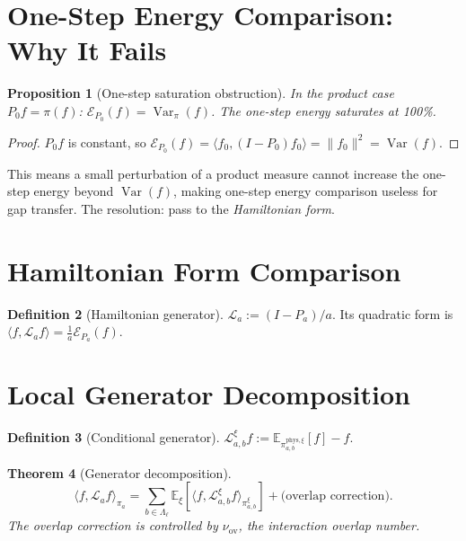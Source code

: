 \documentclass[12pt]{article}
\theoremstyle{plain}
\newtheorem{theorem}{Theorem}[section]
\newtheorem{proposition}[theorem]{Proposition}
\theoremstyle{definition}
\newtheorem{definition}[theorem]{Definition}
\numberwithin{equation}{section}
\newcommand{\Var}{\operatorname{Var}}
\newcommand{\phys}{\mathrm{phys}}
\newcommand{\ov}{\mathrm{ov}}
\begin{document}
\section{One-Step Energy Comparison: Why It Fails}\label{sec:onestepfail}

\begin{proposition}[One-step saturation obstruction]\label{prop:saturation}
In the product case $P_0f=\pi(f)$: $\mathcal{E}_{P_0}(f)=\Var_\pi(f)$.  The one-step energy saturates at 100\%.
\end{proposition}

\begin{proof}
$P_0 f$ is constant, so $\mathcal{E}_{P_0}(f)=\langle f_0,(I-P_0)f_0\rangle=\|f_0\|^2=\Var(f)$.
\end{proof}

This means a small perturbation of a product measure cannot increase the one-step energy beyond $\Var(f)$, making one-step energy comparison useless for gap transfer.  The resolution: pass to the \emph{Hamiltonian form}.


\section{Hamiltonian Form Comparison}\label{sec:hamform}

\begin{definition}[Hamiltonian generator]
$\mathcal{L}_a:=(I-P_a)/a$.  Its quadratic form is $\langle f,\mathcal{L}_a f\rangle=\frac{1}{a}\mathcal{E}_{P_a}(f)$.
\end{definition}


\section{Local Generator Decomposition}\label{sec:localgen}

\begin{definition}[Conditional generator]
$\mathcal{L}_{a,b}^\xi f:=\mathbb{E}_{\pi_{a,b}^{\phys,\xi}}[f]-f$.
\end{definition}

\begin{theorem}[Generator decomposition]\label{thm:gendecomp}
\begin{equation}
\langle f,\mathcal{L}_a f\rangle_{\pi_a} = \sum_{b\in\Lambda_\ell}\mathbb{E}_\xi[\langle f,\mathcal{L}_{a,b}^\xi f\rangle_{\pi_{a,b}^\xi}]+\text{(overlap correction)}.
\end{equation}
The overlap correction is controlled by $\nu_{\ov}$, the interaction overlap number.
\end{theorem}
\end{document}

